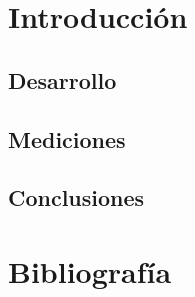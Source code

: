 \documentclass[a4paper,10pt]{article}
\begin{document}

\newpage
\tableofcontents
\newpage


\section{Introducción} 
\label{sec:intro}

\subsection{Desarrollo}
\label{sec:desarrollo}


\subsection{Mediciones}
\label{sec:mediciones}


\subsection{Conclusiones}
\label{sec:conclusiones}



\section{Bibliografía}
\end{document}
